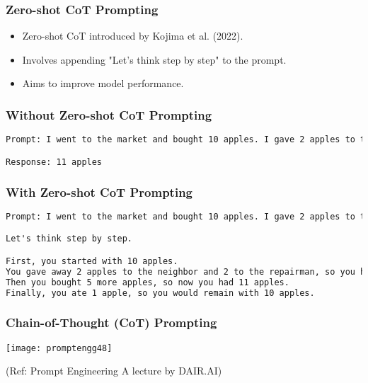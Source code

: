 \begin{frame}[fragile]\frametitle{Zero-shot CoT Prompting}

    \begin{itemize}
      \item Zero-shot CoT introduced by Kojima et al. (2022).
      \item Involves appending "Let's think step by step" to the prompt.
      \item Aims to improve model performance.
    \end{itemize}

\end{frame}

\begin{frame}[fragile]\frametitle{Without Zero-shot CoT Prompting}

\begin{lstlisting}[language=HTML]
Prompt: I went to the market and bought 10 apples. I gave 2 apples to the neighbor and 2 to the repairman. I then went and bought 5 more apples and ate 1. How many apples did I remain with?

Response: 11 apples
\end{lstlisting}


\end{frame}


\begin{frame}[fragile]\frametitle{With Zero-shot CoT Prompting}


\begin{lstlisting}[language=HTML]
Prompt: I went to the market and bought 10 apples. I gave 2 apples to the neighbor and 2 to the repairman. I then went and bought 5 more apples and ate 1. How many apples did I remain with?

Let's think step by step.

First, you started with 10 apples.
You gave away 2 apples to the neighbor and 2 to the repairman, so you had 6 apples left.
Then you bought 5 more apples, so now you had 11 apples.
Finally, you ate 1 apple, so you would remain with 10 apples.
\end{lstlisting}


\end{frame}


\begin{frame}[fragile]\frametitle{Chain-of-Thought (CoT) Prompting}

\begin{center}
\texttt{[image: promptengg48]}

{\tiny (Ref: Prompt Engineering A lecture by DAIR.AI)}

\end{center}	

\end{frame}




